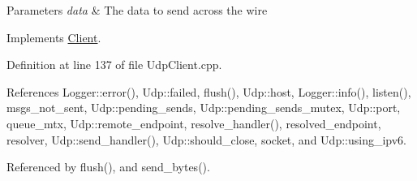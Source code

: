 \begin{DoxyParams}{Parameters}
{\em data} & The data to send across the wire \\
\hline
\end{DoxyParams}


Implements \hyperlink{classClient_ae02f1c7ffac49b7543244da28fbb58aa}{Client}.



Definition at line 137 of file UdpClient.cpp.



References Logger::error(), Udp::failed, flush(), Udp::host, Logger::info(), listen(), msgs\_\-not\_\-sent, Udp::pending\_\-sends, Udp::pending\_\-sends\_\-mutex, Udp::port, queue\_\-mtx, Udp::remote\_\-endpoint, resolve\_\-handler(), resolved\_\-endpoint, resolver, Udp::send\_\-handler(), Udp::should\_\-close, socket, and Udp::using\_\-ipv6.



Referenced by flush(), and send\_\-bytes().


